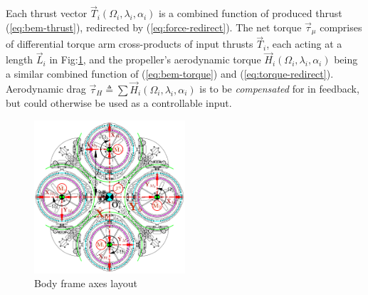\documentclass[a4paper, 10pt, conference]{ieeeconf}
\begin{document}
Each thrust vector $\vec{T}_i(\Omega_i,\lambda_i,\alpha_i)$ is a combined function of produced thrust (\ref{eq:bem-thrust}), redirected by (\ref{eq:force-redirect}). The net torque $\vec{\tau}_\mu$ comprises of differential torque arm cross-products of input thrusts $\vec{T}_i$, each acting at a length $\vec{L}_i$ in Fig:\ref{fig:body-frame}, and the propeller's aerodynamic torque $\vec{H}_i(\Omega_i,\lambda_i,\alpha_i)$ being a similar combined function of (\ref{eq:bem-torque}) and (\ref{eq:torque-redirect}). Aerodynamic drag $\vec{\tau}_H\triangleq\sum\vec{H}_i(\Omega_i,\lambda_i,\alpha_i)$ is to be \emph{compensated} for in feedback, but could otherwise be used as a controllable input.
\par
\begin{figure}[bp]
\vspace{-15pt}
\centering
\includegraphics[width=0.5\textwidth]{figs/body-frame}
\vspace{-18pt}
\caption{Body frame axes layout}
\label{fig:body-frame}
\end{figure}
\end{document}
